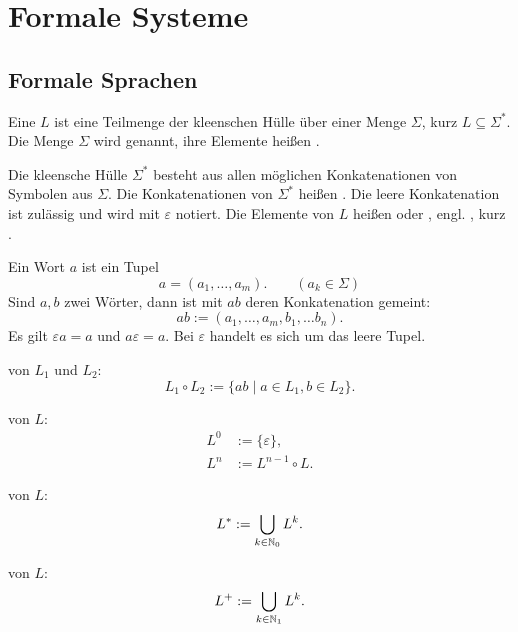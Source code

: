 \newpage
\section{Formale Systeme}
\subsection{Formale Sprachen}
\begin{definition}
Eine  $L$ ist eine Teilmenge der kleenschen
Hülle über einer Menge $\Sigma$, kurz $L\subseteq\Sigma^*$.
Die Menge $\Sigma$ wird  genannt,
ihre Elemente heißen .

Die kleensche Hülle $\Sigma^*$ besteht aus allen möglichen
Konkatenationen von Symbolen aus $\Sigma$. Die Konkatenationen
von $\Sigma^*$ heißen . Die leere Konkatenation ist
zulässig und wird mit $\varepsilon$ notiert. Die Elemente von $L$ heißen
 oder ,
engl. , kurz .
\end{definition}

\noindent
Ein Wort $a$ ist ein Tupel
\begin{equation}
a = (a_1,\ldots, a_m).\qquad (a_k\in\Sigma)
\end{equation}
Sind $a,b$ zwei Wörter, dann ist mit $ab$ deren Konkatenation
gemeint:
\begin{equation}
ab := (a_1,\ldots,a_m,b_1,\ldots b_n).
\end{equation}
Es gilt $\varepsilon a=a$ und $a\varepsilon=a$.
Bei $\varepsilon$ handelt es sich um das leere Tupel.

\begin{definition}
 von $L_1$ und $L_2$:
\begin{equation}
L_1\circ L_2 := \{ab\mid a\in L_1, b\in L_2\}.
\end{equation}
\end{definition}

\begin{definition}
 von $L$:
\begin{align}
L^0 &:= \{\varepsilon\},\\
L^n &:= L^{n-1}\circ L.
\end{align}
\end{definition}

\begin{definition}
 von $L$:
\begin{equation}
L^* := \bigcup_{k\in\mathbb N_0} L^k.
\end{equation}

 von $L$:
\begin{equation}
L^+ := \bigcup_{k\in\mathbb N_1} L^k.
\end{equation}
\end{definition}

